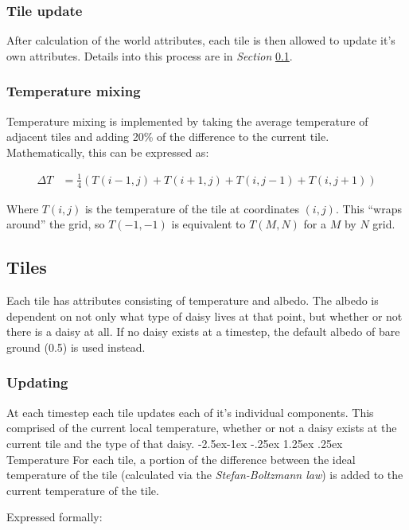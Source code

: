 \documentclass[12pt]{article}
\makeatletter
\renewcommand\paragraph{\@startsection{paragraph}{4}{\z@}%
            {-2.5ex\@plus -1ex \@minus -.25ex}%
            {1.25ex \@plus .25ex}%
            {\normalfont\normalsize\bfseries}}
\makeatother
\begin{document}
\subsubsection{Tile update}
After calculation of the world attributes, each tile is then allowed
to update it's own attributes. Details into this process are in
\emph{Section} \ref{Tiles}.

\subsubsection{Temperature mixing}
Temperature mixing is implemented by taking the average temperature of
adjacent tiles and adding 20\% of the difference to the current tile.
Mathematically, this can be expressed as:

\begin{align}
  \Delta T &= \frac{1}{4}\left(T(i-1,j) + T(i+1,j) + T(i,j-1) + T(i,j+1) \right)
\end{align}

Where $T(i,j)$ is the temperature of the tile at coordinates
$(i,j)$. This ``wraps around'' the grid, so $T(-1,-1)$ is equivalent
to $T(M,N)$ for a $M$ by $N$ grid.

\subsection{Tiles} \label{Tiles}
Each tile has attributes consisting of temperature and albedo. The
albedo is dependent on not only what type of daisy lives at that
point, but whether or not there is a daisy at all. If no daisy exists
at a timestep, the default albedo of bare ground (0.5) is used
instead.
\subsubsection{Updating}
At each timestep each tile updates each of it's individual
components. This comprised of the current local temperature, whether
or not a daisy exists at the current tile and the type of that daisy.
\paragraph{Temperature}
For each tile, a portion of the difference between the ideal
temperature of the tile (calculated via the \emph{Stefan-Boltzmann
  law}) is added to the current temperature of the tile.

Expressed formally:
\end{document}
